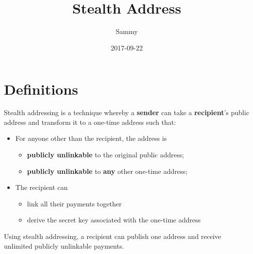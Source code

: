 \documentclass[a4paper,10pt]{article}
\title{Stealth Address}
\author{Sammy}
\date{2017-09-22}
\begin{document}
\maketitle

\section{Definitions}
Stealth addressing is a technique whereby a \textbf{sender} can take a \textbf{recipient}'s public address and transform it to a one-time address such that:
	\begin{itemize}
		\item For anyone other than the recipient, the address is
			\begin{itemize}
				\item \textbf{publicly unlinkable} to the original public address;
				\item \textbf{publicly unlinkable} to \textbf{any} other one-time address;
			\end{itemize}
		\item The recipient can
			\begin{itemize}
				\item link all their payments together 
				\item derive the secret key associated with the one-time address
			\end{itemize}
	\end{itemize}
Using stealth addressing, a recipient can publish one address and receive unlimited publicly unlinkable payments.
\end{document}
